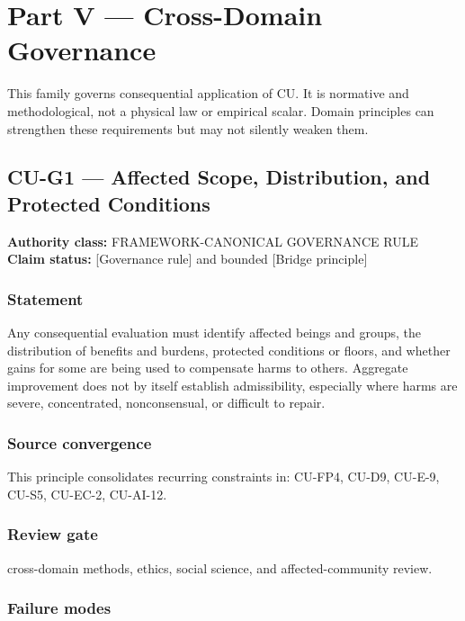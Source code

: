 \documentclass[
  11pt,
]{article}
\begin{document}
\section{Part V --- Cross-Domain
Governance}\label{part-v-cross-domain-governance}

This family governs consequential application of CU. It is normative and
methodological, not a physical law or empirical scalar. Domain
principles can strengthen these requirements but may not silently weaken
them.

\subsection{CU-G1 --- Affected Scope, Distribution, and Protected
Conditions}\label{cu-g1-affected-scope-distribution-and-protected-conditions}

\textbf{Authority class:} FRAMEWORK-CANONICAL GOVERNANCE RULE\\
\textbf{Claim status:} {[}Governance rule{]} and bounded {[}Bridge
principle{]}

\subsubsection{Statement}\label{statement-51}

Any consequential evaluation must identify affected beings and groups,
the distribution of benefits and burdens, protected conditions or
floors, and whether gains for some are being used to compensate harms to
others. Aggregate improvement does not by itself establish
admissibility, especially where harms are severe, concentrated,
nonconsensual, or difficult to repair.

\subsubsection{Source convergence}\label{source-convergence}

This principle consolidates recurring constraints in: CU-FP4, CU-D9,
CU-E-9, CU-S5, CU-EC-2, CU-AI-12.

\subsubsection{Review gate}\label{review-gate-7}

cross-domain methods, ethics, social science, and affected-community
review.

\subsubsection{Failure modes}\label{failure-modes-24}
\end{document}
